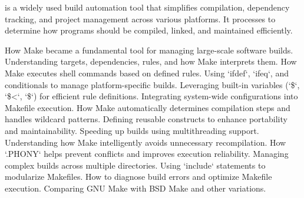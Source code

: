 \begin{NxSSSBox}[breakable][Make]
	\begin{NxIDBox}
		 is a widely used build automation tool that simplifies compilation, dependency tracking, and project management across various platforms. It processes  to determine how programs should be compiled, linked, and maintained efficiently.
	\end{NxIDBox}
	\begin{NxIDBoxL}
		 How Make became a fundamental tool for managing large-scale software builds.
		 Understanding targets, dependencies, rules, and how Make interprets them.
		 How Make executes shell commands based on defined rules.
		 Using `ifdef`, `ifeq`, and conditionals to manage platform-specific builds.
		 Leveraging built-in variables (`\$\@`, `\$<`, `\$\nxHat`) for efficient rule definitions.
		 Integrating system-wide configurations into Makefile execution.
		 How Make automatically determines compilation steps and handles wildcard patterns.
		 Defining reusable constructs to enhance portability and maintainability.
		 Speeding up builds using multithreading support.
		 Understanding how Make intelligently avoids unnecessary recompilation.
		 How `.PHONY` helps prevent conflicts and improves execution reliability.
		 Managing complex builds across multiple directories.
		 Using `include` statements to modularize Makefiles.
		 How to diagnose build errors and optimize Makefile execution.
		 Comparing GNU Make with BSD Make and other variations.
	\end{NxIDBoxL}
\end{NxSSSBox}

